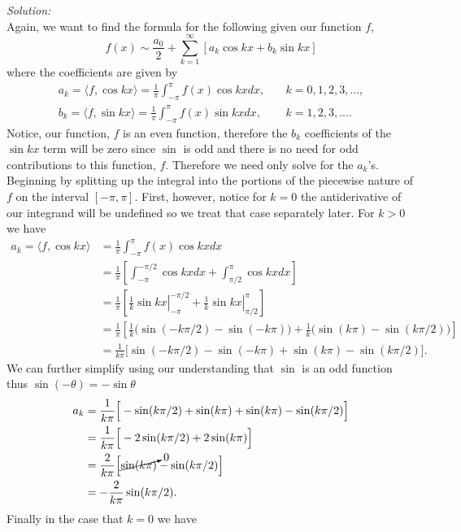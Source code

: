 \documentclass[10pt]{amsart}
\theoremstyle{nonumberplain}
\begin{document}
\begin{enumerate}[label={\bf {\arabic*}:}]
\begin{enumerate}
\noindent
\textit{Solution:} \\
Again, we want to find the formula for the following given our function $f$,
$$
f(x) \sim \frac {a_0} 2 + \sum_{k = 1}^\infty \left[ a_k \cos kx + b_k \sin kx \right]
$$
where the coefficients are given by
\begin{align*}
a_k = \langle f, \cos kx \rangle = \frac 1 \pi \int_{-\pi}^\pi f(x) \cos kx dx, \quad &k = 0, 1, 2, 3, ..., \\
b_k = \langle f, \sin kx \rangle = \frac 1 \pi \int_{-\pi}^\pi f(x) \sin kx dx, \quad &k = 1, 2, 3, ....
\end{align*}
Notice, our function, $f$ is an even function, therefore the $b_k$ coefficients of the $\sin kx$ term will be zero since $\sin$ is odd and there is no need for odd contributions to this function, $f$.
Therefore we need only solve for the $a_k$'s.
Beginning by splitting up the integral into the portions of the piecewise nature of $f$ on the interval $[-\pi,\pi]$.
First, however, notice for $k = 0$ the antiderivative of our integrand will be undefined so we treat that case separately later.
For $k > 0$ we have
\begin{align*}
a_k = \langle f, \cos kx \rangle &= \frac 1 \pi \int_{-\pi}^\pi f(x) \cos kx dx \\
	&= \frac 1 \pi \left[ \int_{-\pi}^{-\pi/2} \cos kx dx +  \int_{\pi/2}^{\pi} \cos kx dx \right] \\
	&= \frac 1 \pi \left[ \left. \frac 1 k \sin kx \right|_{-\pi}^{-\pi/2} + \left. \frac 1 k \sin kx \right|_{\pi/2}^{\pi} \right] \\
	&= \frac 1 \pi \left[ \frac 1 k \big( \sin (-k\pi/2) - \sin (- k\pi) \big) + \frac 1 k \big( \sin (k \pi) - \sin (k\pi/2) \big) \right] \\
	&= \frac 1 {k\pi} \Big[ \sin (-k\pi/2) - \sin (- k\pi) + \sin (k \pi) - \sin (k\pi/2) \Big].
\end{align*}
We can further simplify using our understanding that $\sin$ is an odd function thus $\sin(-\theta) = -\sin\theta$
\begin{align*}
a_k &= \frac 1 {k\pi} \Big[ - \sin (k\pi/2) + \sin (k\pi) + \sin (k \pi) - \sin (k\pi/2) \Big] \\
	&= \frac 1 {k\pi} \Big[ - 2 \sin (k\pi/2) + 2 \sin (k\pi) \Big] \\
	&= \frac 2 {k\pi} \Big[ \cancelto{0}{\sin (k\pi)} - \sin (k\pi/2) \Big] \\
	&= - \frac 2 {k\pi} \sin (k\pi/2).
\end{align*}
Finally in the case that $k = 0$ we have

\end{enumerate}
\end{enumerate}
\end{document}
